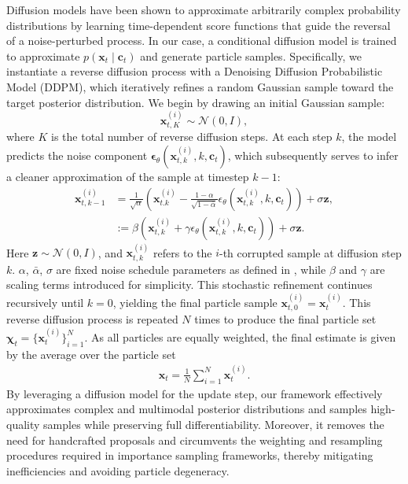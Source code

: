 Diffusion models have been shown to approximate arbitrarily complex probability distributions by learning time-dependent score functions that guide the reversal of a noise-perturbed process\cite{song2020denoising}. In our case, a conditional diffusion model is trained to approximate $p(\bm{x}_t \mid \bm{c}_t)$ and generate particle samples. Specifically, we instantiate a reverse diffusion process with a Denoising Diffusion Probabilistic Model (DDPM), which iteratively refines a random Gaussian sample toward the target posterior distribution. We begin by drawing an initial Gaussian sample:
\begin{equation}
   \bm{x}_{t,K}^{(i)} \sim \mathcal{N}(0, I),
\end{equation}
where $K$ is the total number of reverse diffusion steps. At each step $k$, the model predicts the noise component $\bm{\epsilon}_\theta(\bm{x}_{t,k}^{(i)}, k, \bm{c}_t)$, which subsequently serves to infer a cleaner approximation of the sample at timestep $k-1$:
\begin{equation}
\begin{aligned}
    \bm{x}_{t,k-1}^{(i)} &= \frac{1}{\sqrt{\alpha}} \left( \bm{x}_{t.k}^{(i)} - \frac{1 - \alpha}{\sqrt{1 - \bar{\alpha}}} \epsilon_{\theta}(\bm{x}_{t,k}^{(i)}, k, \bm{c}_t) \right) + \sigma \bm{z}, \\
    &:= \beta(\bm{x}_{t,k}^{(i)} + \gamma\epsilon_\theta(\bm{x}_{t,k}^{(i)}, k, \bm{c}_t)) + \sigma \bm{z}.
\end{aligned}
\end{equation}
Here $\bm{z} \sim \mathcal{N}(0, I)$, and $\bm{x}_{t,k}^{(i)}$ refers to the $i$-th corrupted sample at diffusion step $k$. \( \alpha \), \( \bar{\alpha} \), \( {\sigma} \) are fixed noise schedule parameters as defined in \cite{chan2024tutorial}, while $\beta$ and $\gamma$ are scaling terms introduced for simplicity.
This stochastic refinement continues recursively until $k = 0$, yielding the final particle sample $\bm x_{t,0}^{(i)}= \bm x_{t}^{(i)}.$
This reverse diffusion process is repeated $N$ times to produce the final particle set $\bm{\chi}_{t}=\{\bm{x}_{t}^{(i)}\}_{i=1}^N$. As all particles are equally weighted, the final estimate is given by the average over the particle set
\begin{equation}
\begin{aligned}
    \bm{x}_t = \frac{1}{N} \sum_{i=1}^{N} \bm{x}_t^{(i)}.
\end{aligned}
\end{equation}
By leveraging a diffusion model for the update step, our framework effectively approximates complex and multimodal posterior distributions and samples high-quality samples while preserving full differentiability. Moreover, it removes the need for handcrafted proposals and circumvents the weighting and resampling procedures required in importance sampling frameworks, thereby mitigating inefficiencies and avoiding particle degeneracy. 

